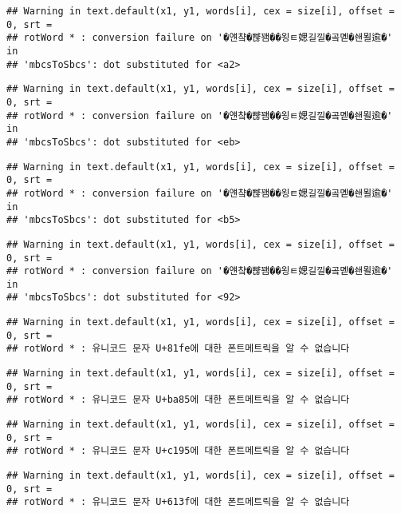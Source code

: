 \documentclass[]{article}
\begin{document}
\begin{verbatim}
## Warning in text.default(x1, y1, words[i], cex = size[i], offset = 0, srt =
## rotWord * : conversion failure on '�얜챸�뺞꽴��욍ㅌ媤길낄�곸몓�쇈묄逾�' in
## 'mbcsToSbcs': dot substituted for <a2>
\end{verbatim}

\begin{verbatim}
## Warning in text.default(x1, y1, words[i], cex = size[i], offset = 0, srt =
## rotWord * : conversion failure on '�얜챸�뺞꽴��욍ㅌ媤길낄�곸몓�쇈묄逾�' in
## 'mbcsToSbcs': dot substituted for <eb>
\end{verbatim}

\begin{verbatim}
## Warning in text.default(x1, y1, words[i], cex = size[i], offset = 0, srt =
## rotWord * : conversion failure on '�얜챸�뺞꽴��욍ㅌ媤길낄�곸몓�쇈묄逾�' in
## 'mbcsToSbcs': dot substituted for <b5>
\end{verbatim}

\begin{verbatim}
## Warning in text.default(x1, y1, words[i], cex = size[i], offset = 0, srt =
## rotWord * : conversion failure on '�얜챸�뺞꽴��욍ㅌ媤길낄�곸몓�쇈묄逾�' in
## 'mbcsToSbcs': dot substituted for <92>
\end{verbatim}

\begin{verbatim}
## Warning in text.default(x1, y1, words[i], cex = size[i], offset = 0, srt =
## rotWord * : 유니코드 문자 U+81fe에 대한 폰트메트릭을 알 수 없습니다
\end{verbatim}

\begin{verbatim}
## Warning in text.default(x1, y1, words[i], cex = size[i], offset = 0, srt =
## rotWord * : 유니코드 문자 U+ba85에 대한 폰트메트릭을 알 수 없습니다
\end{verbatim}

\begin{verbatim}
## Warning in text.default(x1, y1, words[i], cex = size[i], offset = 0, srt =
## rotWord * : 유니코드 문자 U+c195에 대한 폰트메트릭을 알 수 없습니다
\end{verbatim}

\begin{verbatim}
## Warning in text.default(x1, y1, words[i], cex = size[i], offset = 0, srt =
## rotWord * : 유니코드 문자 U+613f에 대한 폰트메트릭을 알 수 없습니다
\end{verbatim}
\end{document}
